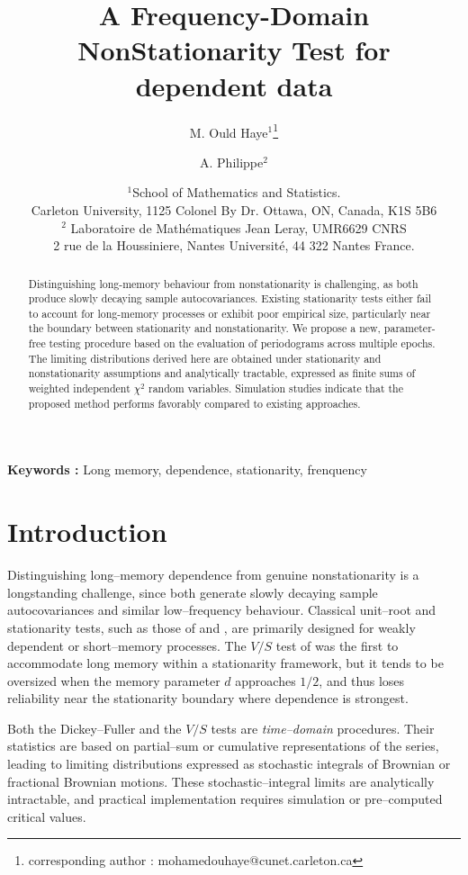 \documentclass[12pt]{article}
\title{A Frequency-Domain NonStationarity Test for  dependent data}
\author{ M. Ould Haye$^1$\footnote{corresponding author : {mohamedouhaye@cunet.carleton.ca}} \and
  A. Philippe$^2$
}
\date{$^1$\small  School of Mathematics and Statistics. \\
Carleton University, 1125 Colonel By Dr. Ottawa, ON, Canada, K1S 5B6
\\ $^2$  Laboratoire de Math\'{e}matiques Jean Leray, UMR6629 CNRS \\
2 rue de la Houssiniere, Nantes Université, 44 322 Nantes France.}
\begin{document}
\maketitle
\begin{abstract}
Distinguishing long-memory behaviour from nonstationarity is challenging, as both produce slowly decaying sample autocovariances. Existing stationarity tests either fail to account for long-memory processes or exhibit poor empirical size, particularly near the boundary between stationarity and nonstationarity. We propose a new, parameter-free testing procedure based on the evaluation of periodograms across multiple epochs. The limiting distributions derived here are obtained under stationarity and nonstationarity assumptions and analytically tractable, expressed as finite sums of weighted independent $\chi^2$ random variables. Simulation studies indicate that the proposed method performs favorably compared to existing approaches.
\end{abstract}
\textbf{Keywords :} Long memory, dependence, stationarity, frenquency

\section{Introduction}
Distinguishing long--memory dependence from genuine nonstationarity is a longstanding challenge, since both generate slowly decaying sample autocovariances and similar low--frequency behaviour. Classical unit--root and stationarity tests, such as those of \cite{pptest}  and \citet{MR3505787}, are primarily designed for weakly dependent or short--memory processes. The $V/S$ test of \cite{MR2328526} was the first to accommodate long memory within a stationarity framework, but it tends to be oversized when the memory parameter $d$ approaches $1/2$, and thus loses reliability near the stationarity boundary where dependence is strongest.

\medskip
Both the Dickey--Fuller and the $V/S$ tests are \emph{time--domain} procedures. Their statistics are based on partial--sum or cumulative representations of the series, leading to limiting distributions expressed as stochastic integrals of Brownian or fractional Brownian motions. These stochastic--integral limits are analytically intractable, and practical implementation requires simulation or pre--computed critical values.
\end{document}
